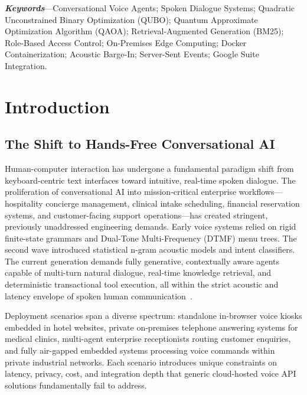 \documentclass[11pt,a4paper]{article}
\begin{document}
\noindent\textbf{\textit{Keywords}}---Conversational Voice Agents; Spoken Dialogue Systems; Quadratic Unconstrained Binary Optimization (QUBO); Quantum Approximate Optimization Algorithm (QAOA); Retrieval-Augmented Generation (BM25); Role-Based Access Control; On-Premises Edge Computing; Docker Containerization; Acoustic Barge-In; Server-Sent Events; Google Suite Integration.

\newpage
\tableofcontents
\newpage

\section{Introduction}
\label{sec:introduction}

\subsection{The Shift to Hands-Free Conversational AI}
\label{subsec:shift_voice}

Human-computer interaction has undergone a fundamental paradigm shift from keyboard-centric text interfaces toward intuitive, real-time spoken dialogue. The proliferation of conversational AI into mission-critical enterprise workflows---hospitality concierge management, clinical intake scheduling, financial reservation systems, and customer-facing support operations---has created stringent, previously unaddressed engineering demands. Early voice systems relied on rigid finite-state grammars and Dual-Tone Multi-Frequency (DTMF) menu trees. The second wave introduced statistical n-gram acoustic models and intent classifiers. The current generation demands fully generative, contextually aware agents capable of multi-turn natural dialogue, real-time knowledge retrieval, and deterministic transactional tool execution, all within the strict acoustic and latency envelope of spoken human communication~\cite{mctear2022conversational}.

Deployment scenarios span a diverse spectrum: standalone in-browser voice kiosks embedded in hotel websites, private on-premises telephone answering systems for medical clinics, multi-agent enterprise receptionists routing customer enquiries, and fully air-gapped embedded systems processing voice commands within private industrial networks. Each scenario introduces unique constraints on latency, privacy, cost, and integration depth that generic cloud-hosted voice API solutions fundamentally fail to address.
\end{document}
